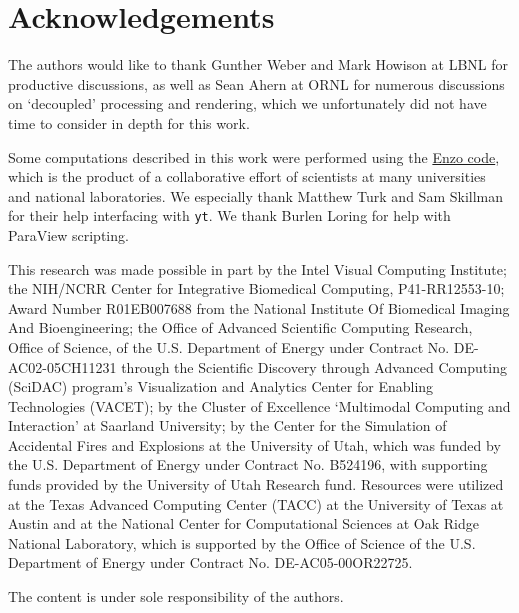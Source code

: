 \section*{Acknowledgements}

The authors would like to thank Gunther Weber and Mark Howison at
LBNL for productive discussions, as well as Sean Ahern at ORNL for
numerous discussions on `decoupled' processing and rendering, which we
unfortunately did not have time to consider in depth for this work.

Some computations described in this work were performed using the
\href{http://enzo-project.org}{Enzo code}, which is the product of a
collaborative effort of scientists at many universities and national
laboratories.  We especially thank Matthew Turk and Sam Skillman for
their help interfacing with \texttt{yt}.  We thank Burlen Loring for
help with ParaView scripting.

This research was made possible in part by the Intel Visual
Computing Institute; the NIH/NCRR Center for Integrative Biomedical
Computing, P41-RR12553-10; Award Number R01EB007688 from the National
Institute Of Biomedical Imaging And Bioengineering; the Office of
Advanced Scientific Computing Research, Office of Science, of the
U.S. Department of Energy under Contract No. DE-AC02-05CH11231
through the Scientific Discovery through Advanced Computing (SciDAC)
program's Visualization and Analytics Center for Enabling Technologies
(VACET); by the Cluster of Excellence `Multimodal Computing and
Interaction' at Saarland University; by the Center for the Simulation
of Accidental Fires and Explosions at the University of Utah, which was
funded by the U.S. Department of Energy under Contract No. B524196,
with supporting funds provided by the University of Utah Research
fund. Resources were utilized at the Texas Advanced Computing Center
(TACC) at the University of Texas at Austin and at the National Center
for Computational Sciences at Oak Ridge National Laboratory, which is
supported by the Office of Science of the U.S. Department of Energy
under Contract No. DE-AC05-00OR22725.

The content is under sole responsibility of the authors.
